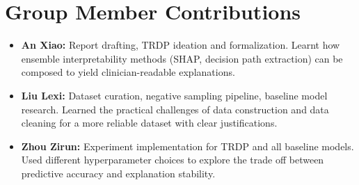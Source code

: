 \documentclass[letterpaper]{article} %
\begin{document}



\section{Group Member Contributions}
\begin{itemize}
    \item \textbf{An Xiao:} Report drafting, TRDP ideation and formalization. Learnt how ensemble interpretability methods (SHAP, decision path extraction) can be composed to yield clinician-readable explanations.
    \item \textbf{Liu Lexi:} Dataset curation, negative sampling pipeline, baseline model research. Learned the practical challenges of data construction and data cleaning for a more reliable dataset with clear justifications.
    \item \textbf{Zhou Zirun:} Experiment implementation for TRDP and all baseline models. Used different hyperparameter choices to explore the trade off between predictive accuracy and explanation stability.
\end{itemize}
\end{document}
